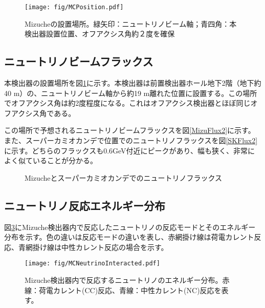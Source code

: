 \documentclass[11pt]{jreport}
\newcommand{\figref}[1]{図\ref{#1}}
\begin{document}
\begin{figure}[htbp]
\centering
\texttt{[image: fig/MCPosition.pdf]}
\caption[Mizucheの設置場所]{Mizucheの設置場所。緑矢印：ニュートリノビーム軸；青四角：本検出器設置位置、オフアクシス角約２度を確保}
\label{MCPosition}
\end{figure}

\subsection{ニュートリノビームフラックス}
本検出器の設置場所を\figref{MCPosition}に示す。本検出器は前置検出器ホール地下2階（地下約40 m）の、ニュートリノビーム軸から約19 m離れた位置に設置する。この場所でオフアクシス角は約2度程度になる。これはオフアクシス検出器とほぼ同じオフアクシス角である。

この場所で予想されるニュートリノビームフラックスを\figref{MizuFlux2}に示す。また、スーパーカミオカンデで位置でのニュートリノフラックスを\figref{SKFlux2}に示す。どちらのフラックスも0.6GeV付近にピークがあり、幅も狭く、非常によく似ていることが分かる。

\begin{figure}[htbp]
  \begin{minipage}{0.47\textwidth}
  \end{minipage}
  \hfill
  \begin{minipage}{0.47\textwidth}
  \end{minipage}
    \caption[Mizucheとスーパーカミオカンデでのニュートリノフラックス]{Mizucheとスーパーカミオカンデでのニュートリノフラックス}
  \label{MizuSKFlux2}
\end{figure}

\subsection{ニュートリノ反応エネルギー分布}

\figref{MCNeutrinoInteracted}にMizuche検出器内で反応したニュートリノの反応モードとそのエネルギー分布を示す。色の違いは反応モードの違いを表し、赤網掛け線は荷電カレント反応、青網掛け線は中性カレント反応の場合を示す。

\begin{figure}[htbp]
\centering
\texttt{[image: fig/MCNeutrinoInteracted.pdf]}
\caption[Mizuche検出器内で反応するニュートリノのエネルギー分布]{Mizuche検出器内で反応するニュートリノのエネルギー分布。赤線：荷電カレント(CC)反応、青線：中性カレント(NC)反応を表す。}
\label{MCNeutrinoInteracted}
\end{figure}
\end{document}
